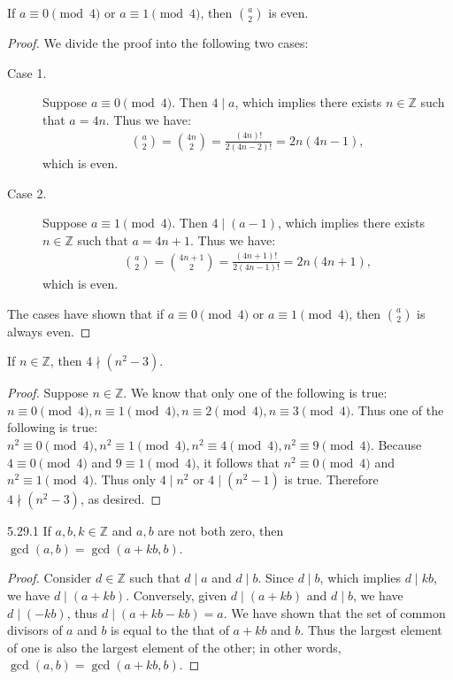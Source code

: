 \documentclass{exam}
\begin{document}
\begin{proposition}{5.27}
    If $a\equiv0\pmod4$ or $a\equiv1\pmod4$, then $\binom a 2$ is even.
\end{proposition}

\begin{proof}
    We divide the proof into the following two cases:
    \begin{description}
        \item[Case 1. ] Suppose $a\equiv0\pmod4$. Then $4\mid a$, which implies there exists $n\in\mathbb Z$ such that $a = 4n$. Thus we have:
        \begin{align*}
            \binom{a}2=\binom{4n}2=\frac{(4n)!}{2(4n-2)!}=2n(4n-1),
        \end{align*}
        which is even.
        \item[Case 2. ] Suppose $a\equiv1\pmod4$. Then $4\mid(a-1)$, which implies there exists $n\in\mathbb Z$ such that $a=4n+1$. Thus we have:
        \begin{align*}
            \binom a 2=\binom{4n+1}2 = \frac{(4n+1)!}{2(4n-1)!} = 2n(4n+1),
        \end{align*}
        which is even.
    \end{description}
    The cases have shown that if $a\equiv0\pmod4$ or $a\equiv1\pmod4$, then $\binom a 2$ is always even.
\end{proof}

\begin{proposition}{5.28}
    If $n\in\mathbb Z$, then $4\nmid (n^2-3)$.
\end{proposition}

\begin{proof}
    Suppose $n\in\mathbb Z$. We know that only one of the following is true: $n\equiv 0\pmod 4, n\equiv1\pmod4, n\equiv2\pmod4, n\equiv3\pmod4$. Thus one of the following is true: $n^2\equiv0\pmod4, n^2\equiv1\pmod4, n^2\equiv4\pmod4, n^2\equiv9\pmod4$. Because $4\equiv0\pmod4$ and $9\equiv1\pmod4$, it follows that $n^2\equiv0\pmod4$ and $n^2\equiv1\pmod4$. Thus only $4\mid n^2$ or $4\mid (n^2-1)$ is true. Therefore $4\nmid (n^2-3)$, as desired.
\end{proof}

\begin{proposition}{5.29.1}
    If $a, b, k\in\mathbb Z$ and $a, b$ are not both zero, then $\gcd(a, b) = \gcd(a+kb, b)$.
\end{proposition}

\begin{proof}
    Consider $d\in\mathbb Z$ such that $d\mid a$ and $d\mid b$. Since $d\mid b$, which implies $d\mid kb$, we have $d\mid (a + kb)$. Conversely, given $d\mid(a+kb)$ and $d\mid b$, we have $d\mid(-kb)$, thus $d\mid (a+kb-kb)=a$. We have shown that the set of common divisors of $a$ and $b$ is equal to the that of $a+kb$ and $b$. Thus the largest element of one is also the largest element of the other; in other words, $\gcd(a, b) = \gcd(a+kb, b)$.
\end{proof}
\end{document}
